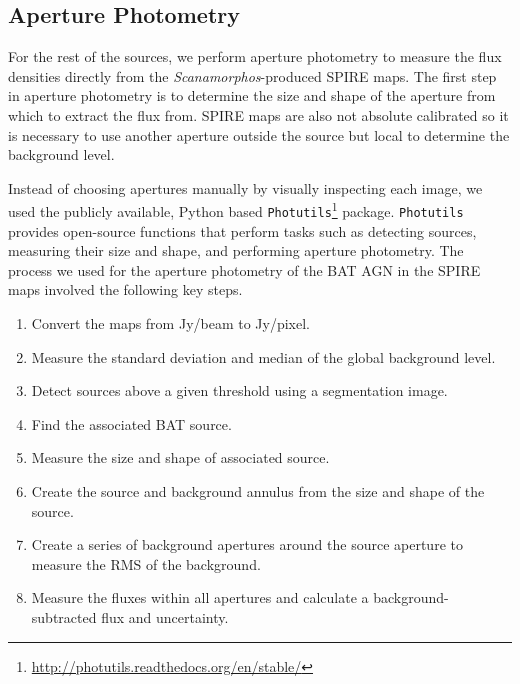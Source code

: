 \subsection{Aperture Photometry}\label{aperture}
For the rest of the sources, we perform aperture photometry to measure the flux densities directly from the \textit{Scanamorphos}-produced SPIRE maps. The first step in aperture photometry is to determine the size and shape of the aperture from which to extract the flux from. SPIRE maps are also not absolute calibrated so it is necessary to use another aperture outside the source but local to determine the background level.

Instead of choosing apertures manually by visually inspecting each image, we used the publicly available, Python based \texttt{Photutils}\footnote{\url{http://photutils.readthedocs.org/en/stable/}} package. \texttt{Photutils} provides open-source functions that perform tasks such as detecting sources, measuring their size and shape, and performing aperture photometry. The process we used for the aperture photometry of the BAT AGN in the SPIRE maps involved the following key steps.

\begin{enumerate}
    \item Convert the maps from Jy/beam to Jy/pixel.
    \item Measure the standard deviation and median of the global background level.
    \item Detect sources above a given threshold using a segmentation image.
    \item Find the associated BAT source.
    \item Measure the size and shape of associated source.
    \item Create the source and background annulus from the size and shape of the source.
    \item Create a series of background apertures around the source aperture to measure the RMS of the background.
    \item Measure the fluxes within all apertures and calculate a background-subtracted flux and uncertainty.
\end{enumerate}
  
  
  
  